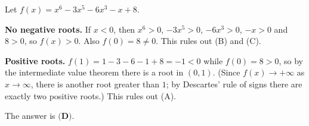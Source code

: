 Let $f(x)=x^6-3x^5-6x^3-x+8$.

\textbf{No negative roots.} If $x<0$, then $x^6>0$, $-3x^5>0$, $-6x^3>0$, $-x>0$ and $8>0$, so $f(x)>0$. Also $f(0)=8\ne0$. This rules out (B) and (C).

\textbf{Positive roots.} $f(1)=1-3-6-1+8=-1<0$ while $f(0)=8>0$, so by the intermediate value theorem there is a root in $(0,1)$. (Since $f(x)\to+\infty$ as $x\to\infty$, there is another root greater than $1$; by Descartes' rule of signs there are exactly two positive roots.) This rules out (A).

The answer is $\boxed{\textbf{(D)}}$.

